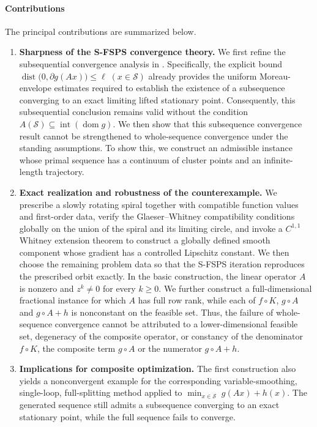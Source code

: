 \documentclass[11pt]{article}
\numberwithin{equation}{section}
\begin{document}
\paragraph{Contributions}
The principal contributions are summarized below.
\begin{enumerate}[label=\textup{(\roman*)},leftmargin=2.3em]

\item \textbf{Sharpness of the S-FSPS convergence theory.}
We first refine the subsequential convergence analysis in
\cite[Theorem~4.3]{BotLiTao2025}. Specifically, the explicit bound
$
\operatorname{dist}\bigl(0,\partial g(Ax)\bigr)\leq \ell
\; (x\in\mathcal S)
$
already provides the uniform Moreau-envelope estimates required to establish
the existence of a subsequence converging to an exact limiting lifted
stationary point. Consequently, this subsequential conclusion remains valid
without the  condition
$
A(\mathcal S)\subseteq\operatorname{int}(\operatorname{dom}g).
$
We then show that this subsequence convergence result  cannot be strengthened to
whole-sequence convergence under the standing assumptions. To show this, we
construct an admissible instance whose primal sequence has a continuum of cluster points and an
infinite-length trajectory.


\item \textbf{Exact realization and robustness of the counterexample.}
We prescribe a slowly rotating spiral together with compatible function
values and first-order data, verify the Glaeser--Whitney compatibility
conditions globally on the union of the spiral and its limiting circle, and
invoke a \(C^{1,1}\) Whitney extension theorem
\cite{DaniilidisEtAl2018} to construct a globally defined smooth component
whose gradient has a controlled Lipschitz constant. We then
choose the remaining problem data so that the S-FSPS iteration reproduces the
prescribed orbit exactly. In the basic construction, the linear operator \(A\) is nonzero and
\(z^k\neq 0\) for every \(k\geq 0\).
 We further construct a
full-dimensional fractional instance for which \(A\) has full row rank,
while each of  \(f\circ K\), \(g\circ A\) and $g\circ A+h$ is nonconstant on the
feasible set. Thus, the failure of whole-sequence convergence cannot be
attributed to a lower-dimensional feasible set, degeneracy of the composite
operator, or constancy of the denominator \(f\circ K\), the composite term \(g\circ A\) or the numerator $g\circ A+h$.

\item \textbf{Implications for composite optimization.}
The first construction also yields a nonconvergent example for the corresponding
variable-smoothing, single-loop, full-splitting method applied to
$
\min_{x\in\mathcal S}\; g(Ax)+h(x).
$
The generated sequence still admits a subsequence converging to an exact
 stationary point, while the full sequence fails to converge.

\end{enumerate}
\end{document}
